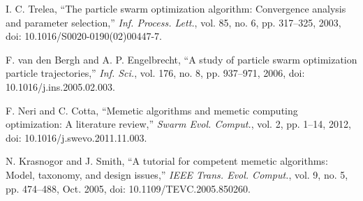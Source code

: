 I. C. Trelea, ``The particle swarm optimization algorithm: Convergence analysis and parameter selection,'' \textit{Inf. Process. Lett.}, vol. 85, no. 6, pp. 317--325, 2003, doi: 10.1016/S0020-0190(02)00447-7.

F. van den Bergh and A. P. Engelbrecht, ``A study of particle swarm optimization particle trajectories,'' \textit{Inf. Sci.}, vol. 176, no. 8, pp. 937--971, 2006, doi: 10.1016/j.ins.2005.02.003.

F. Neri and C. Cotta, ``Memetic algorithms and memetic computing optimization: A literature review,'' \textit{Swarm Evol. Comput.}, vol. 2, pp. 1--14, 2012, doi: 10.1016/j.swevo.2011.11.003.

N. Krasnogor and J. Smith, ``A tutorial for competent memetic algorithms: Model, taxonomy, and design issues,'' \textit{IEEE Trans. Evol. Comput.}, vol. 9, no. 5, pp. 474--488, Oct. 2005, doi: 10.1109/TEVC.2005.850260.
